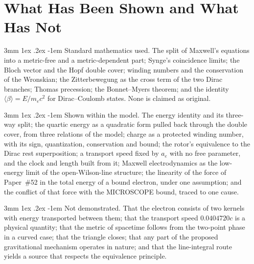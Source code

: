 \documentclass[%
 reprint, amsmath,amssymb, aps, prb, ]{revtex4-2}
\makeatletter
\numberwithin{equation}{section}
\renewcommand\paragraph{%
  \@startsection{paragraph}{4}{\z@}%
    {3mm \@plus 1ex \@minus .2ex}%
    {-1em}%
    {\normalfont\normalsize\itshape}}
\makeatother
\begin{document}
\section{What Has Been Shown and What Has Not}
\label{sec:status}

\paragraph{Standard mathematics used.} The split of Maxwell's equations into a metric-free and a metric-dependent part; Synge's coincidence limits; the Bloch vector and the Hopf double cover; winding numbers and the conservation of the Wronskian; the Zitterbewegung as the cross term of the two Dirac branches; Thomas precession; the Bonnet--Myers theorem; and the identity $\langle\beta\rangle = E/m_ec^{2}$ for Dirac--Coulomb states. None is claimed as original.

\paragraph{Shown within the model.} The energy identity and its three-way split; the quartic energy as a quadratic form pulled back through the double cover, from three relations of the model; charge as a protected winding number, with its sign, quantization, conservation and bound; the rotor's equivalence to the Dirac rest superposition; a transport speed fixed by $a_e$ with no free parameter, and the clock and length built from it; Maxwell electrodynamics as the low-energy limit of the open-Wilson-line structure; the linearity of the force of Paper~\#52 in the total energy of a bound electron, under one assumption; and the conflict of that force with the MICROSCOPE bound, traced to one cause.

\paragraph{Not demonstrated.} That the electron consists of two kernels with energy transported between them; that the transport speed $0.0404720c$ is a physical quantity; that the metric of spacetime follows from the two-point phase in a curved case; that the triangle closes; that any part of the proposed gravitational mechanism operates in nature; and that the line-integral route yields a source that respects the equivalence principle.
\end{document}
